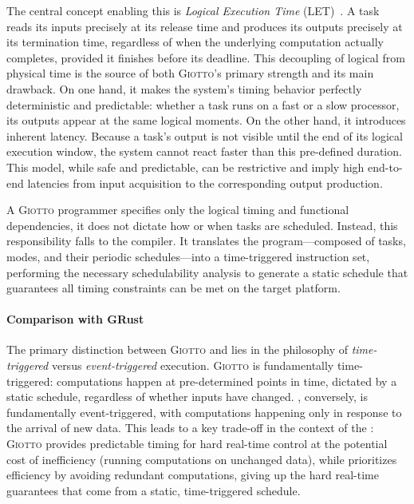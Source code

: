 The central concept enabling this is \emph{Logical Execution Time}
(LET)~\cite{DBLP:conf/birthday/KirschS12}. A task reads its inputs precisely at its release time and
produces its outputs precisely at its termination time, regardless of when the underlying
computation actually completes, provided it finishes before its deadline. This decoupling of logical
from physical time is the source of both \textsc{Giotto}'s primary strength and its main drawback.
On one hand, it makes the system's timing behavior perfectly deterministic and predictable: whether
a task runs on a fast or a slow processor, its outputs appear at the same logical moments. On the
other hand, it introduces inherent latency. Because a task's output is not visible until the end of
its logical execution window, the system cannot react faster than this pre-defined duration. This
model, while safe and predictable, can be restrictive and imply high end-to-end latencies from input
acquisition to the corresponding output production.

A \textsc{Giotto} programmer specifies only the logical timing and functional dependencies, it does
not dictate how or when tasks are scheduled. Instead, this responsibility falls to the compiler. It
translates the program---composed of tasks, modes, and their periodic schedules---into a
time-triggered instruction set, performing the necessary schedulability analysis to generate a
static schedule that guarantees all timing constraints can be met on the target platform.

\paragraph*{Comparison with GRust}
The primary distinction between \textsc{Giotto} and \GRust lies in the philosophy of
\emph{time-triggered} versus \emph{event-triggered} execution. \textsc{Giotto} is
fundamentally time-triggered: computations happen at pre-determined points in time, dictated
by a static schedule, regardless of whether inputs have changed. \GRust, conversely, is
fundamentally event-triggered, with computations happening only in response to the arrival of
new data. This leads to a key trade-off in the context of the \sdv: \textsc{Giotto} provides
predictable timing for hard real-time control at the potential cost of inefficiency (running
computations on unchanged data), while \GRust prioritizes efficiency by avoiding redundant
computations, giving up the hard real-time guarantees that come from a static,
time-triggered schedule.

